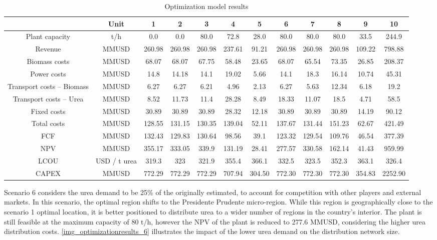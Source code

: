 \documentclass[a4paper, titlepage]{article}
\begin{document}
\begin{table}
	\caption{Optimization model results}
	\label{tab_optimizationresults}
	\begin{tabular}{|| c | c | c | c  | c | c | c | c | c | c | c | c ||}
		\hline
		 & Unit & 1 & 2 & 3 & 4 & 5 & 6 & 7 & 8 & 9 & 10 \\
		 \hline
		Plant capacity & t/h & 0.0 & 0.0 & 80.0 & 72.8 & 28.0 & 80.0 & 80.0 & 80.0 & 33.5 & 244.9 \\
		Revenue & MMUSD & 260.98 & 260.98 & 260.98 & 237.61 & 91.21 & 260.98 & 260.98 & 260.98 & 109.22 & 798.88 \\
		Biomass costs & MMUSD & 68.07 & 68.07 & 67.75 & 58.48 & 23.65 & 68.07 & 65.54 & 73.35 & 26.85 & 208.37 \\
		Power costs & MMUSD & 14.8 & 14.18 & 14.1 & 19.02 & 5.66 & 14.1 & 18.3 & 16.14 & 10.74 & 45.31 \\
		Transport costs – Biomass & MMUSD & 6.27 & 6.27 & 6.21 & 4.96 & 2.13 & 6.27 & 5.63 & 12.34 & 6.18 & 19.2 \\
		Transport costs – Urea & MMUSD & 8.52 & 11.73 & 11.4 & 28.28 & 8.49 & 18.33 & 11.07 & 18.5 & 4.71 & 58.5 \\
		Fixed costs & MMUSD & 30.89 & 30.89 & 30.89 & 28.32 & 12.18 & 30.89 & 30.89 & 30.89 & 14.19 & 90.12 \\
		Total costs & MMUSD & 128.55 & 131.15 & 130.35 & 139.04 & 52.11 & 137.67 & 131.44 & 151.23 & 62.67 & 421.49 \\
		FCF & MMUSD & 132.43 & 129.83 & 130.64 & 98.56 & 39.1 & 123.32 & 129.54 & 109.76 & 46.54 & 377.39 \\
		NPV & MMUSD & 355.17 & 333.05 & 339.9 & 131.19 & 28.41 & 277.57 & 330.58 & 162.14 & 41.43 & 959.99 \\
		LCOU & USD / t urea & 319.3 & 323 & 321.9 & 355.4 & 366.1 & 332.5 & 323.5 & 352.3 & 363.1 & 326.4 \\
		CAPEX & MMUSD & 772.29 & 772.29 & 772.29 & 707.94 & 304.50 & 772.30 & 772.30 & 772.30 & 354.83 & 2252.90 \\
		\hline
	\end{tabular}

\end{table}

Scenario 6 considers the urea demand to be 25\% of the originally estimated, to account for competition with other
players and external markets. In this scenario, the optimal region shifts to the Presidente Prudente micro-region. While
this region is geographically close to the scenario 1 optimal location, it is better positioned to distribute urea
to a wider number of regions in the country's interior. The plant is still feasible at the maximum capacity of 80 t/h,
however the NPV of the plant is reduced to 277.6 MMUSD, considering the higher urea distribution costs. \autoref{img_optimizationresults_6} illustrates the impact of the lower urea demand on the distribution network size.
\end{document}
